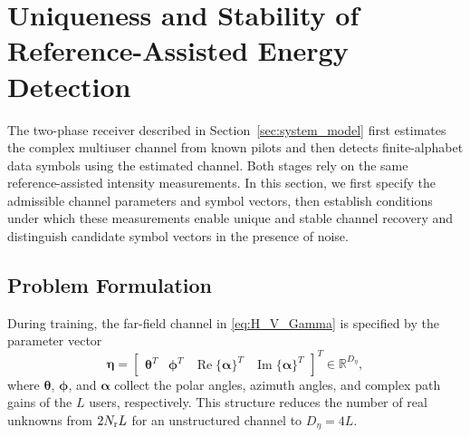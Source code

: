 \documentclass[journal]{IEEEtran}
\begin{document}
\section{Uniqueness and Stability of Reference-Assisted Energy Detection}
\label{sec:uniqueness_stability}

The two-phase receiver described in Section~\ref{sec:system_model} first estimates the complex multiuser channel from known pilots and then detects finite-alphabet data symbols using the estimated channel. Both stages rely on the same reference-assisted intensity measurements. In this section, we first specify the admissible channel parameters and symbol vectors, then establish conditions under which these measurements enable unique and stable channel recovery and distinguish candidate symbol vectors in the presence of noise.

\subsection{Problem Formulation}
\label{subsec:problem_formulation}

During training, the far-field channel in \eqref{eq:H_V_Gamma} is specified by the parameter
vector
\begin{equation}
\boldsymbol{\eta}
=
\begin{bmatrix}
\boldsymbol{\theta}^{T} &
\boldsymbol{\phi}^{T} &
\operatorname{Re}\{\boldsymbol{\alpha}\}^{T} &
\operatorname{Im}\{\boldsymbol{\alpha}\}^{T}
\end{bmatrix}^{T}
\in\mathbb{R}^{D_{\eta}},
\label{eq:channel_parameter_vector}
\end{equation}
where $\boldsymbol{\theta}$, $\boldsymbol{\phi}$, and
$\boldsymbol{\alpha}$ collect the polar angles, azimuth angles, and complex
path gains of the $L$ users, respectively. This structure reduces the number
of real unknowns from $2N_{\rm r}L$ for an unstructured channel to
$D_{\eta}=4L$.
\end{document}
